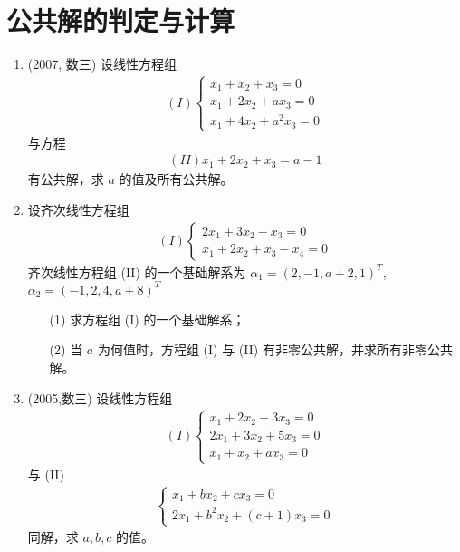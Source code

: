 \documentclass[12pt, a4paper, oneside, UTF8]{ctexbook}
\begin{document}
\section{公共解的判定与计算}

\begin{enumerate}[label=\arabic*.,start=12]
    \item (2007, 数三) 设线性方程组
    \begin{align*}
    (I) \begin{cases}
    x_1 + x_2 + x_3 = 0 \\
    x_1 + 2x_2 + a x_3 = 0 \\
    x_1 + 4x_2 + a^2 x_3 = 0
    \end{cases}
    \end{align*}
    与方程
    \begin{align*}
    (II) x_1 + 2x_2 + x_3 = a - 1
    \end{align*}
    有公共解，求 $a$ 的值及所有公共解。
    
    \begin{solution}
    \newpage
    \end{solution}
    
    \item 设齐次线性方程组
    \begin{align*}
    (I) \begin{cases}
    2x_1 + 3x_2 - x_3 = 0 \\
    x_1 + 2x_2 + x_3 - x_4 = 0
    \end{cases}
    \end{align*}
    齐次线性方程组 (II) 的一个基础解系为 $\alpha_1 = (2, -1, a+2, 1)^T$, $\alpha_2 = (-1, 2, 4, a+8)^T$ 
    \begin{enumerate}
        \item [(1)] 求方程组 (I) 的一个基础解系；
        \item [(2)] 当 $a$ 为何值时，方程组 (I) 与 (II) 有非零公共解，并求所有非零公共解。
    \end{enumerate}
    
    \begin{solution}
    \newpage
    \end{solution}
    
    \item (2005,数三) 设线性方程组
    \begin{align*}
    (I) \begin{cases}
    x_1 + 2x_2 + 3x_3 = 0 \\
    2x_1 + 3x_2 + 5x_3 = 0 \\
    x_1 + x_2 + a x_3 = 0
    \end{cases}
    \end{align*}
    与 (II) 
    \begin{align*}
    \begin{cases}
    x_1 + b x_2 + c x_3 = 0 \\
    2x_1 + b^2 x_2 + (c+1) x_3 = 0
    \end{cases}
    \end{align*}
    同解，求 $a, b, c$ 的值。
    
    \begin{solution}
    \newpage
    \end{solution}
\end{enumerate}


\ifx\allfiles\undefined
\end{document}
